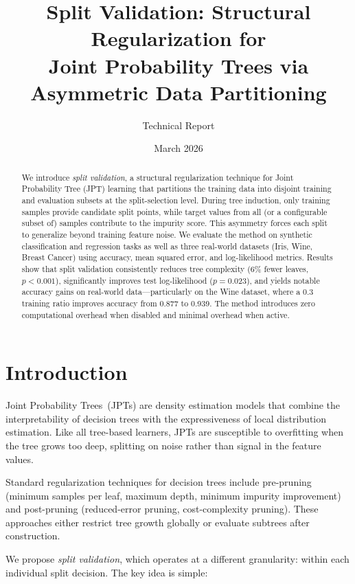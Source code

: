 \documentclass[11pt,a4paper]{article}
\title{Split Validation: Structural Regularization for\\Joint Probability Trees via Asymmetric Data Partitioning}
\author{Technical Report}
\date{March 2026}
\begin{document}
\maketitle

\begin{abstract}
We introduce \emph{split validation}, a structural regularization technique for
Joint Probability Tree (JPT) learning that partitions the training data into
disjoint training and evaluation subsets at the split-selection level. During
tree induction, only training samples provide candidate split points, while
target values from all (or a configurable subset of) samples contribute to the
impurity score. This asymmetry forces each split to generalize beyond training
feature noise. We evaluate the method on synthetic classification and regression
tasks as well as three real-world datasets (Iris, Wine, Breast Cancer) using
accuracy, mean squared error, and log-likelihood metrics. Results show that
split validation consistently reduces tree complexity (6\% fewer leaves,
$p < 0.001$), significantly improves test log-likelihood ($p = 0.023$), and
yields notable accuracy gains on real-world data---particularly on the Wine
dataset, where a 0.3 training ratio improves accuracy from 0.877 to 0.939.
The method introduces zero computational overhead when disabled and minimal
overhead when active.
\end{abstract}

\section{Introduction}
\label{sec:intro}

Joint Probability Trees~(JPTs) are density estimation models that combine the
interpretability of decision trees with the expressiveness of local
distribution estimation. Like all tree-based learners, JPTs are susceptible to
overfitting when the tree grows too deep, splitting on noise rather than signal
in the feature values.

Standard regularization techniques for decision trees include pre-pruning
(minimum samples per leaf, maximum depth, minimum impurity improvement) and
post-pruning (reduced-error pruning, cost-complexity pruning). These approaches
either restrict tree growth globally or evaluate subtrees after construction.

We propose \emph{split validation}, which operates at a different granularity:
within each individual split decision. The key idea is simple:
\end{document}
